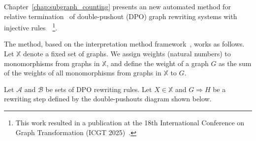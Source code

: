 

Chapter~\ref{chap:subgraph_counting} presents an new automated method for relative termination~\cite{geser1990relative} of double-pushout (DPO) graph rewriting systems with injective rules~\cite{corradini1997algebraic,habel2001double,konig2018atutorial}~\footnote{This work resulted in a publication at the 18th International Conference on Graph Transformation (ICGT 2025)~\cite{qiu2025termination_icgt}.}. 

The method, based on the interpretation method framework~\cite{nipkow1998term,contejean2005mechanically}, works as follows. Let \( \mathbb{X} \) denote a fixed set of graphs. We assign weights (natural numbers) to monomorphisms from graphs in \( \mathbb{X} \), and define the weight of a graph $G$ as the sum of the weights of all monomorphisms from graphs in \( \mathbb{X} \) to $G$. 

Let $\mathcal{A}$ and $\mathcal{B}$ be sets of DPO rewriting rules. Let $X \in \mathbb{X}$ and $G \Rightarrow H$ be a rewriting step defined by the double-pushouts diagram shown below. 
\begin{center}
    \end{center}

